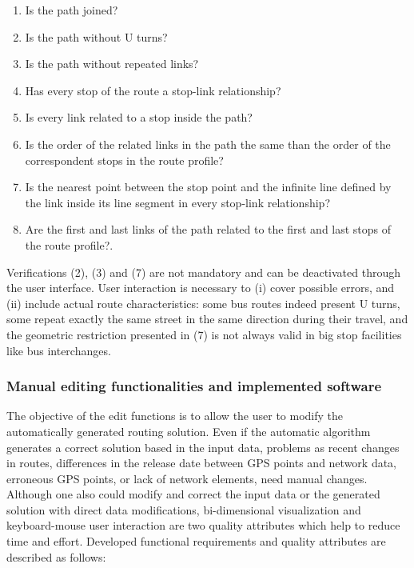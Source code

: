 \begin{enumerate}
\item Is the path joined?
\item Is the path without U turns?
\item Is the path without repeated links?
\item Has every stop of the route a stop-link relationship?
\item Is every link related to a stop inside the path?
\item Is the order of the related links in the path the same than the order of the correspondent stops in the route profile?
\item Is the nearest point between the stop point and the infinite line defined by the link inside its line segment in every stop-link relationship?
\item Are the first and last links of the path related to the first and last  stops of the route profile?.
\end{enumerate}

Verifications (2), (3) and (7) are not mandatory and can be deactivated through the user interface. User interaction is necessary to (i) cover possible errors, and (ii) include actual route characteristics: some bus routes indeed present U turns, some repeat exactly the same street in the same direction during their travel, and the geometric restriction presented in (7) is not always valid in big stop facilities like bus interchanges.

\subsubsection{Manual editing functionalities and implemented software}

The objective of the edit functions is to allow the user to modify the automatically generated routing solution. Even if the automatic algorithm generates a correct solution based in the input data, problems as recent changes in routes, differences in the release date between GPS points and network data, erroneous GPS points, or lack of network elements, need manual changes. Although one also could modify and correct the input data or the generated solution with direct data modifications, bi-dimensional visualization and keyboard-mouse user interaction are two quality attributes which help to reduce time and effort. Developed functional requirements and quality attributes are described as follows:

